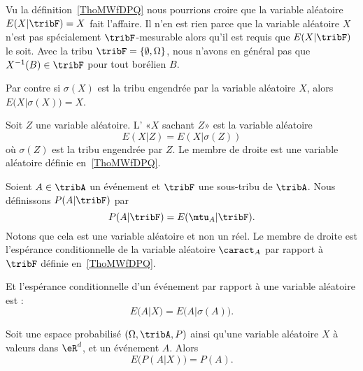 \begin{normaltext}      \label{NORMooHPHOooUuJWHR}
	Vu la définition~\ref{ThoMWfDPQ} nous pourrions croire que la variable aléatoire \( E(X|\tribF)=X\) fait l'affaire. Il n'en est rien parce que la variable aléatoire \( X\) n'est pas spécialement \( \tribF\)-mesurable alors qu'il est requis que \( E(X|\tribF)\) le soit. Avec la tribu \( \tribF=\{ \emptyset,\Omega \}\), nous n'avons en général pas que \( X^{-1}(B)\in \tribF\) pour tout borélien \( B\).

	Par contre si \( \sigma(X)\) est la tribu engendrée par la variable aléatoire \( X\), alors \( E\big( X |\sigma(X) \big)=X\).
\end{normaltext}

\begin{definition}      \label{DefooKIHPooMhvirn}
	Soit \( Z\) une variable aléatoire. L' «\( X\) sachant \( Z\)» est la variable aléatoire
	\begin{equation}
		E(X|Z)=E(X|\sigma(Z))
	\end{equation}
	où \( \sigma(Z)\) est la tribu engendrée par \( Z\). Le membre de droite est une variable aléatoire définie en~\ref{ThoMWfDPQ}.
\end{definition}

\begin{definition}      \label{DEFooEYVCooCeyOXW}
	Soient \( A\in\tribA\) un événement et \( \tribF\) une sous-tribu de \( \tribA\). Nous définissons \( P(A|\tribF)\) par
	\begin{equation}
		P(A|\tribF)=E(\mtu_{A}|\tribF).
	\end{equation}
	Notons que cela est une variable aléatoire et non un réel. Le membre de droite est l'espérance conditionnelle de la variable aléatoire \( \caract_A\) par rapport à \( \tribF\) définie en~\ref{ThoMWfDPQ}.

	Et l'espérance conditionnelle d'un événement par rapport à une variable aléatoire est :
	\begin{equation}
		E(A|X)=E\big( A|\sigma(A) \big).
	\end{equation}
\end{definition}


\begin{proposition}
	Soit une espace probabilisé \( (\Omega,\tribA,P)\) ainsi qu'une variable aléatoire \( X\) à valeurs dans \( \eR^d\), et un événement \( A\). Alors
	\begin{equation}
		E\big( P(A|X) \big)=P(A).
	\end{equation}
\end{proposition}

